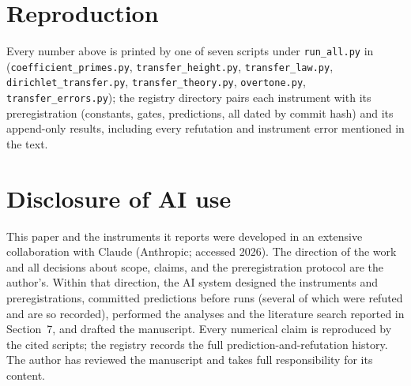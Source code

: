 \documentclass[11pt]{article}
\theoremstyle{definition}
\theoremstyle{remark}
\begin{document}
\section{Reproduction}

Every number above is printed by one of seven scripts under \texttt{run\_all.py} in \cite{Code}
(\texttt{coefficient\_primes.py}, \texttt{transfer\_height.py}, \texttt{transfer\_law.py},
\texttt{dirichlet\_transfer.py}, \texttt{transfer\_theory.py}, \texttt{overtone.py},
\texttt{transfer\_errors.py}); the registry directory pairs each instrument with its
preregistration (constants, gates, predictions, all dated by commit hash) and its append-only
results, including every refutation and instrument error mentioned in the text.

\section*{Disclosure of AI use}

This paper and the instruments it reports were developed in an extensive collaboration with
Claude (Anthropic; accessed 2026). The direction of the work and all decisions about scope,
claims, and the preregistration protocol are the author's. Within that direction, the AI system
designed the instruments and preregistrations, committed predictions before runs (several of
which were refuted and are so recorded), performed the analyses and the literature search
reported in Section~7, and drafted the manuscript. Every numerical claim is reproduced by the
cited scripts; the registry records the full prediction-and-refutation history. The author has
reviewed the manuscript and takes full responsibility for its content.
\end{document}
